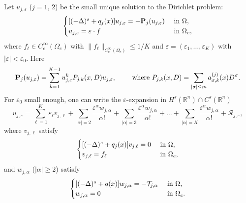 \documentclass [oneside,11pt] {amsart}
\numberwithin{equation}{section}
\newcommand{\R}{\mathbb{R}}
\begin{document}
Let $u_{j,\varepsilon }$ ($j=1,\,2$) be the small unique solution to the Dirichlet problem:
\begin{equation}\label{eq_3_linearization section 4}
\begin{cases}
[(-\Delta)^s + q_j(x)]u_{j,\varepsilon } =- \mathbf{P}_j(u_{j,\varepsilon}) &\hbox{ in } \Omega,\\
u_{j,\varepsilon } =\varepsilon\cdot f &\hbox{ in } \Omega_e,
\end{cases}
\end{equation}
where $f_\ell\in C^\infty_c(\Omega_e)$ with $\|f_\ell\|_{C_c^\infty(\Omega_e)}\le 1/K$ and $\varepsilon = (\varepsilon_1,\ldots,\varepsilon_K)$ with $|\varepsilon|<\varepsilon_0$.  
Here 
\begin{align*}
\mathbf{P}_j(u_{j,\varepsilon })=\sum^{K-1}_{k=1}u_{j,\varepsilon }^{k}P_{j,k}(x,D) u_{j,\varepsilon }, \qquad\hbox{ where }
P_{j,k}(x,D) = \sum_{|\sigma|\leq m}a_{\sigma,k }^{(j)}  (x)D^\sigma.
\end{align*} 
For $\varepsilon_0$ small enough, one can write the $\varepsilon$-expansion in $H^s(\R^n)\cap C^s(\R^n)$
\begin{equation}\label{u_expansion}
u_{j,\varepsilon } =  \sum_{\ell=1}^K\varepsilon_{\ell} v_{j,\ell}
+ 
\sum_{|\alpha|=2}\frac{\varepsilon^\alpha w_{j,\alpha}}{\alpha!}
+ 
\sum_{|\alpha|=3}\frac{\varepsilon^\alpha w_{j,\alpha}}{\alpha!}+ \ldots+  \sum_{|\alpha|=K}\frac{\varepsilon^\alpha w_{j,\alpha}}{\alpha!}+\mathcal{R}_{j,\varepsilon},
\end{equation}
where $v_{j,\ell}$ satisfy
\begin{equation}\label{eq_3_linear vj}
\begin{cases}
[(-\Delta)^s + q_j(x)]v_{j,\ell} = 0 &\hbox{ in } \Omega,\\
v_{j,\ell} = f_\ell &\hbox{ in } \Omega_e,
\end{cases}
\end{equation}
and $w_{j,\alpha}$ ($|\alpha|\geq 2$) satisfy
\begin{equation}\label{eq_3_linear_w j}
\begin{cases}
[(-\Delta)^s + q(x)]w_{j,\alpha}=-\mathcal{T}_{j,\alpha} &\hbox{ in } \Omega,\\
w_{j,\alpha}= 0 &\hbox{ in } \Omega_e.
\end{cases}
\end{equation}
\end{document}
